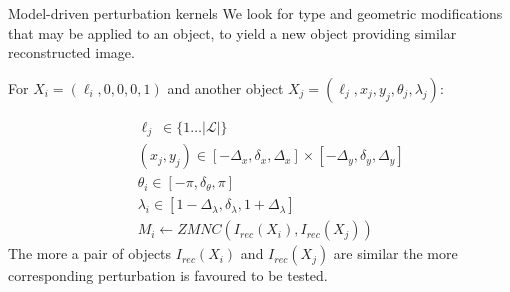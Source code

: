 \documentclass{beamer}
\begin{document}
\begin{frame}{Model-driven perturbation kernels}
We look for type and geometric  modifications that may be applied to an object, to yield a new object providing similar reconstructed image.

 For $X_i=(\ell_i,0,0,0,1)$ and another object $X_j=(\ell_j,x_j,y_j,\theta_j,\lambda_j)$:

\begin{eqnarray}
\nonumber &&\ell_j\ \in \lbrace 1 \dots |\mathcal{L}|\rbrace\\
\nonumber &&(x_j,y_j) \in [-\Delta_x,\delta_x,\Delta_x]\times [-\Delta_y,\delta_y,\Delta_y]\\
\nonumber &&\theta_i \in [-\pi,\delta_\theta,\pi]\\
\nonumber &&\lambda_i \in [1-\Delta_\lambda,\delta_\lambda,1+\Delta_\lambda]\\
\nonumber && M_i \leftarrow ZMNC (I_{rec}(X_i),I_{rec}(X_j))
\end{eqnarray} 
The more a pair of objects $I_{rec}(X_i)$ and $I_{rec}(X_j)$ are similar the more corresponding perturbation is favoured to be tested. 
\end{frame}
\end{document}
